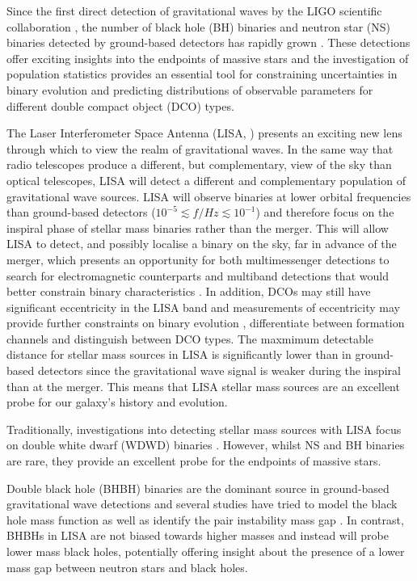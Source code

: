 Since the first direct detection of gravitational waves by the LIGO scientific collaboration \citep{Abbott+2016_first_detection}, the number of black hole (BH) binaries and neutron star (NS) binaries detected by ground-based detectors has rapidly grown \citep{Abbott+2019_GWTC1,Abbott+2020_GWTC2}. These detections offer exciting insights into the endpoints of massive stars and the investigation of population statistics provides an essential tool for constraining uncertainties in binary evolution and predicting distributions of observable parameters for different double compact object (DCO) types. 

The Laser Interferometer Space Antenna (LISA, \citealp{Amaro-Seoane+2017}) presents an exciting new lens through which to view the realm of gravitational waves. In the same way that radio telescopes produce a different, but complementary, view of the sky than optical telescopes, LISA will detect a different and complementary population of gravitational wave sources. LISA will observe binaries at lower orbital frequencies than ground-based detectors ($10^{-5} \lesssim f / \unit{Hz} \lesssim 10^{-1}$) and therefore focus on the inspiral phase of stellar mass binaries rather than the merger. This will allow LISA to detect, and possibly localise a binary on the sky, far in advance of the merger, which presents an opportunity for both multimessenger detections to search for electromagnetic counterparts and multiband detections that would better constrain binary characteristics \citep[e.g.][]{Gerosa+2019}. In addition, DCOs may still have significant eccentricity in the LISA band and measurements of eccentricity may provide further constraints on binary evolution \citep[e.g.][]{Breivik+2016}, differentiate between formation channels and distinguish between DCO types. The maxmimum detectable distance for stellar mass sources in LISA is significantly lower than in ground-based detectors since the gravitational wave signal is weaker during the inspiral than at the merger. This means that LISA stellar mass sources are an excellent probe for our galaxy's history and evolution.

Traditionally, investigations into detecting stellar mass sources with LISA focus on double white dwarf (WDWD) binaries \citep{Ruiter+2010,Yu+2010,Nissanke+2012,Korol+2017,Lamberts+2018}. However, whilst NS and BH binaries are rare, they provide an excellent probe for the endpoints of massive stars.

Double black hole (BHBH) binaries are the dominant source in ground-based gravitational wave detections and several studies have tried to model the black hole mass function as well as identify the pair instability mass gap \citep[e.g.][]{Baxter+2021}. In contrast, BHBHs in LISA are not biased towards higher masses and instead will probe lower mass black holes, potentially offering insight about the presence of a lower mass gap between neutron stars and black holes.

